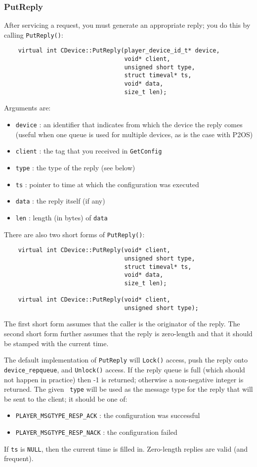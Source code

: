 \documentclass[11pt]{report}
\begin{document}
\subsubsection{PutReply}
After servicing a request, you must generate an appropriate reply; you do this
by calling {\tt PutReply()}:
\begin{verbatim}
    virtual int CDevice::PutReply(player_device_id_t* device, 
                                  void* client, 
                                  unsigned short type, 
                                  struct timeval* ts, 
                                  void* data, 
                                  size_t len);
\end{verbatim}
Arguments are:
\begin{itemize}
\item {\tt device} : an identifier that indicates from which the device the
reply comes (useful when one queue is used for multiple devices,
as is the case with P2OS)
\item {\tt client} : the tag that you received in {\tt GetConfig}
\item {\tt type} : the type of the reply (see below)
\item {\tt ts} : pointer to time at which the configuration was executed
\item {\tt data} : the reply itself (if any)
\item {\tt len} : length (in bytes) of {\tt data}
\end{itemize}
There are also two short forms of {\tt PutReply()}:
\begin{verbatim}
    virtual int CDevice::PutReply(void* client, 
                                  unsigned short type, 
                                  struct timeval* ts, 
                                  void* data, 
                                  size_t len);

    virtual int CDevice::PutReply(void* client, 
                                  unsigned short type);
\end{verbatim}
The first short form assumes that the caller is the originator of the reply.
The second short form further assumes that the reply is zero-length and
that it should be stamped with the current time.

The default implementation of {\tt PutReply} will {\tt Lock()} access,
push the reply onto {\tt device\_repqueue}, and {\tt Unlock()} access.
If the reply queue is full (which should not happen in practice) then -1
is returned; otherwise a non-negative integer is returned.  The given {\tt
type} will be used as the message type for the reply that will be sent to
the client; it should be one of:
\begin{itemize}
\item {\tt PLAYER\_MSGTYPE\_RESP\_ACK} : the configuration was successful
\item {\tt PLAYER\_MSGTYPE\_RESP\_NACK} : the configuration failed
\end{itemize}
If {\tt ts} is {\tt NULL}, then the current time is filled in.  Zero-length
replies are valid (and frequent).
\end{document}
